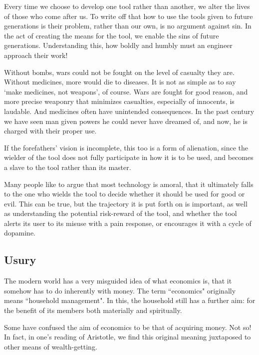 \documentclass[letterpaper]{article}
\begin{document}
Every time we choose to develop one tool rather than another, we alter the lives of those who come after us. To write off that how to use the tools given to future generations is their problem, rather than our own, is no argument against sin. In the act of creating the means for the tool, we enable the sins of future generations. Understanding this, how boldly and humbly must an engineer approach their work!

Without bombs, wars could not be fought on the level of casualty they are. Without medicines, more would die to diseases. It is not as simple as to say `make medicines, not weapons', of course. Wars are fought for good reason, and more precise weaponry that minimizes casualties, especially of innocents, is laudable. And medicines often have unintended consequences. In the past century we have seen man given powers he could never have dreamed of, and now, he is charged with their proper use.

If the forefathers' vision is incomplete, this too is a form of alienation, since the wielder of the tool does not fully participate in how it is to be used, and becomes a slave to the tool rather than its master.

Many people like to argue that most technology is amoral, that it ultimately falls to the one who wields the tool to decide whether it should be used for good or evil. This can be true, but the trajectory it is put forth on is important, as well as understanding the potential risk-reward of the tool, and whether the tool alerts its user to its misuse with a pain response, or encourages it with a cycle of dopamine.


\subsection{Usury}

The modern world has a very misguided idea of what economics is, that it somehow has to do inherently with money. The term ``economics" originally means ``household management". In this, the household still has a further aim: for the benefit of its members both materially and spiritually.

Some have confused the aim of economics to be that of acquiring money. Not so! In fact, in one's reading of Aristotle, we find this original meaning juxtaposed to other means of wealth-getting.
\end{document}

